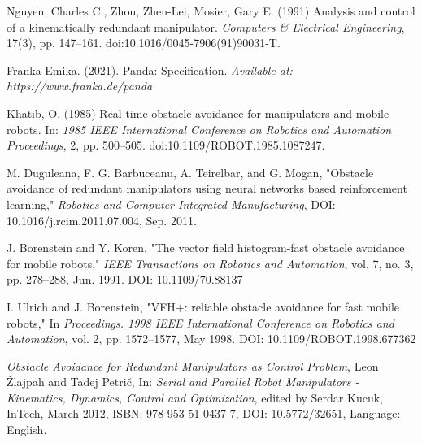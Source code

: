 \documentclass[a4paper]{article}
\begin{document}
\small
\begin{thebibliography}{1}
	
	
 Nguyen, Charles C., Zhou, Zhen-Lei, Mosier, Gary E. (1991) Analysis and control of a kinematically redundant manipulator. \textit{Computers \& Electrical Engineering}, 17(3), pp. 147–161. doi:10.1016/0045-7906(91)90031-T.

 Franka Emika. (2021). Panda: Specification. \textit{Available at: https://www.franka.de/panda}

 Khatib, O. (1985) Real-time obstacle avoidance for manipulators and mobile robots. In: \textit{1985 IEEE International Conference on Robotics and Automation Proceedings}, 2, pp. 500–505. doi:10.1109/ROBOT.1985.1087247.

M. Duguleana, F. G. Barbuceanu, A. Teirelbar, and G. Mogan,
"Obstacle avoidance of redundant manipulators using neural networks based reinforcement learning,"
\textit{Robotics and Computer-Integrated Manufacturing}, 
DOI: 10.1016/j.rcim.2011.07.004, Sep. 2011.

J. Borenstein and Y. Koren,
"The vector field histogram-fast obstacle avoidance for mobile robots,"
\textit{IEEE Transactions on Robotics and Automation}, 
vol. 7, no. 3, pp. 278–288, Jun. 1991.
DOI: 10.1109/70.88137

I. Ulrich and J. Borenstein,
"VFH+: reliable obstacle avoidance for fast mobile robots,"
In \textit{Proceedings. 1998 IEEE International Conference on Robotics and Automation}, 
vol. 2, pp. 1572–1577, May 1998.
DOI: 10.1109/ROBOT.1998.677362

\textit{Obstacle Avoidance for Redundant Manipulators as Control Problem},
Leon Žlajpah and Tadej Petrič,
In: \textit{Serial and Parallel Robot Manipulators - Kinematics, Dynamics, Control and Optimization},
edited by Serdar Kucuk,
InTech, March 2012,
ISBN: 978-953-51-0437-7,
DOI: 10.5772/32651,
Language: English.






\end{thebibliography}
\end{document}
